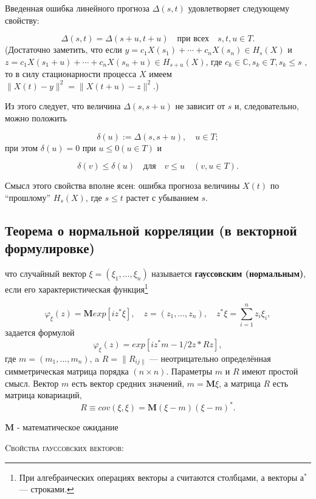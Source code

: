Введенная ошибка линейного прогноза $\Delta(s, t)$ удовлетворяет следующему свойству:

$$\Delta(s, t) = \Delta(s + u, t + u) \quad \text{при всех} \quad s, t, u \in T.$$
(Достаточно заметить, что если $y = c_1X(s_1) + \dotsb 
+ c_nX(s_n) \in H_s(X)$ и $z = c_1X(s_1 + u) + \dotsb 
+ c_nX(s_n + u) \in H_{s+u}(X)$, где $c_k \in 
\mathbb{C}, s_k \in T, s_k \leq s$ , то в силу 
стационарности процесса $X$ имеем $\parallel  X(t) - y \parallel ^2 = 
\parallel  X(t + u) - z\parallel ^2.$)


Из этого следует, что величина $\Delta(s, s + u)$ не зависит от $s$ и, следовательно, можно
положить

$$\delta(u):=\Delta(s, s+u), \quad u \in T;$$
при этом $\delta(u) = 0$ при $u \leq 0 (u \in T)$ и

$$\delta(v) \leq \delta(u) \quad \text{для} \quad v \leq u \quad (v, u \in T).$$


Смысл этого свойства вполне ясен: ошибка прогноза величины $X(t)$ по “прошлому”
$H_s(X)$, где $s \leq t$ растет с убыванием $s$.



\subsection{Теорема о нормальной корреляции (в векторной формулировке)}

\begin{definition} что случайный вектор $\xi=(\xi_1, \ldots, \xi_n)$ называется \textbf{гауссовским (нормальным)}, если его характеристическая
функция\footnote{При алгебраических операциях векторы $а$ считаются столбцами, а векторы $а^*$ — строками.} 

$$\varphi_\xi(z)=\mathbf{M}exp[iz^*\xi], \quad z=(z_1, \ldots, z_n), \quad z^*\xi=\sum\limits_{i=1}^n z_i\xi_i,$$
задается формулой
$$\varphi_\xi(z)=exp[iz^*m-1/2z*Rz],$$
где $m = (m_1, \ldots, m_n)$, a $R = \parallel R_{ij\parallel }$ — неотрицательно определённая симметрическая матрица порядка $(n\times n).$ Параметры $m$ и $R$
имеют простой смысл. Вектор $m$ есть вектор средних значений,
$m = \mathbf{M}\xi$, а матрица $R$ есть матрица ковариаций,
$$R\equiv cov(\xi,\xi)=\mathbf{M}(\xi-m)(\xi-m)^*.$$

$\mathbf{M}$ - математическое ожидание \\

\end{definition}

\textsc{Cвойства гауссовских векторов}:\\

